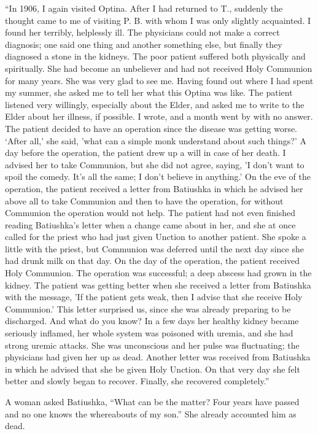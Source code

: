 “In 1906, I again visited Optina. After I had returned to T., suddenly the thought came to me of visiting P. B. with whom I was only slightly acquainted. I found her terribly, helplessly ill. The physicians could not make a correct diagnosis; one said one thing and another something else, but finally they diagnosed a stone in the kidneys. The poor patient suffered both physically and spiritually. She had become an unbeliever and had not received Holy Communion for many years. She was very glad to see me. Having found out where I had spent my summer, she asked me to tell her what this Optina was like. The patient listened very willingly, especially about the Elder, and asked me to write to the Elder about her illness, if possible. I wrote, and a month went by with no answer. The patient decided to have an operation since the disease was getting worse. ‘After all,' she said, 'what can a simple monk understand about such things?' A day before the operation, the patient drew up a will in case of her death. I advised her to take Communion, but she did not agree, saying, 'I don't want to spoil the comedy. It's all the same; I don't believe in anything.' On the eve of the operation, the patient received a letter from Batiushka in which he advised her above all to take Communion and then to have the operation, for without Communion the operation would not help. The patient had not even finished reading Batiushka's letter when a change came about in her, and she at once called for the priest who had just given Unction to another patient. She spoke a little with the priest, but Communion was deferred until the next day since she had drunk milk on that day. On the day of the operation, the patient received Holy Communion. The operation was successful; a deep abscess had grown in the kidney. The patient was getting better when she received a letter from Batiushka with the message, 'If the patient gets weak, then I advise that she receive Holy Communion.' This letter surprised us, since she was already preparing to be discharged. And what do you know? In a few days her healthy kidney became seriously inflamed, her whole system was poisoned with uremia, and she had strong uremic attacks. She was unconscious and her pulse was fluctuating; the physicians had given her up as dead. Another letter was received from Batiushka in which he advised that she be given Holy Unction. On that very day she felt better and slowly began to recover. Finally, she recovered completely.”

A woman asked Batiushka, “What can be the matter? Four years have passed and no one knows the whereabouts of my son.” She already accounted him as dead.


